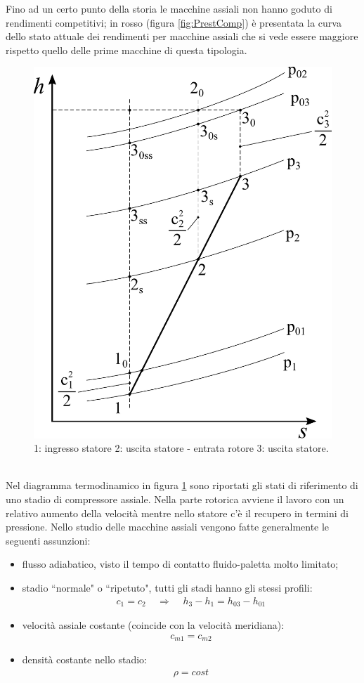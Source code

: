 Fino ad un certo punto della storia le macchine assiali non hanno goduto di rendimenti competitivi; in rosso (figura \ref{fig:PrestComp}) è presentata la curva dello stato attuale dei rendimenti per macchine assiali che si vede essere maggiore rispetto quello delle prime macchine di questa tipologia. 
\begin{figure}
\centering
  \includegraphics[width=.4\textwidth]{fig/hsComp.pdf}
\caption{1: ingresso statore 2: uscita statore - entrata rotore 3: uscita statore.}
\label{fig:hsComp}
\end{figure}
\\Nel diagramma termodinamico in figura \ref{fig:hsComp} sono riportati gli stati di riferimento di uno stadio di compressore assiale. Nella parte rotorica avviene il lavoro con un relativo aumento della velocità mentre nello statore c'è il recupero in termini di pressione. Nello studio delle macchine assiali vengono fatte generalmente le seguenti assunzioni:
\begin{itemize}
\item flusso adiabatico, visto il tempo di contatto fluido-paletta molto limitato;
\item stadio ``normale" o ``ripetuto", tutti gli stadi hanno gli stessi profili:
\begin{align*}
c_1 = c_2 \;\;\;\; \Rightarrow \;\;\;\; h_3-h_1 = h_{03} - h_{01}
\end{align*}
\item velocità assiale costante (coincide con la velocità meridiana):
\begin{align*}
c_{m1} = c_{m2}
\end{align*}
\item densità costante nello stadio:
\begin{align*}
\rho = cost
\end{align*}
\end{itemize}
